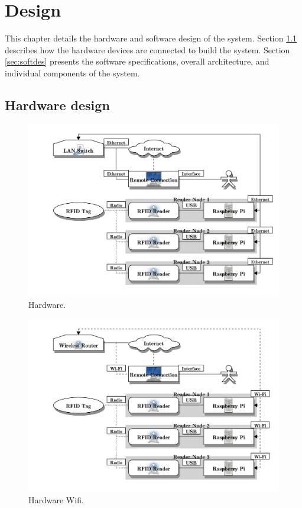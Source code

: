 \chapter{Design}
\label{ch:design}

This chapter details the hardware and software design of the system. Section \ref{sec:harddes} describes how the hardware devices are connected to build the system. Section \ref{sec:softdes} presents the software specifications, overall architecture, and individual components of the system.

\section{Hardware design}
\label{sec:harddes}

\begin{figure}
	\begin{center}
		\includegraphics[width=1\textwidth]{figures/blockdiag/hardwaredesign}
		\caption{Hardware.}
		\label{fig:harddes}
	\end{center}
\end{figure}

\begin{figure}
	\begin{center}
		\includegraphics[width=1\textwidth]{figures/blockdiag/hardwaredesignwifi}
		\caption{Hardware Wifi.}
		\label{fig:harddeswifi}
	\end{center}
\end{figure}


